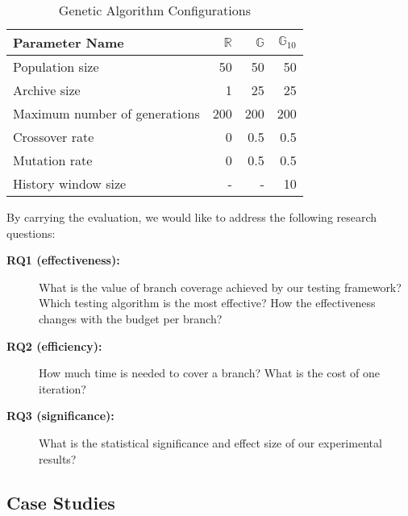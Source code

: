 \documentclass[sigconf,review,anonymous]{acmart}
\newcommand{\Random}{\mathbb{R}}
\newcommand{\Genetic}{\mathbb{G}}
\newcommand{\RGenetic}{\mathbb{G}_{10}}
\begin{document}
\begin{table}
  \caption{Genetic Algorithm Configurations}
  \label{tbl.gen.config}
    \scriptsize
  \begin{tabular}{l|r|r|r}
    \toprule
    \textbf{Parameter Name} &$\Random$&$\Genetic$ &$\RGenetic$ \\
    \hline
    Population size                   & 50  & 50  & 50  \\
    Archive size                      & 1   & 25  & 25  \\
    Maximum number of generations     & 200 & 200 & 200 \\
    Crossover rate                    & 0   & 0.5 & 0.5 \\
    Mutation rate                     & 0   & 0.5 & 0.5 \\
    History window size               & -   & -   & 10  \\
    \bottomrule
  \end{tabular}
\end{table}

By carrying the evaluation, we would like to address the following research questions:
\begin{description}
\item[\textbf{RQ1 (effectiveness):}] What is the value of branch coverage achieved by our testing framework? Which testing algorithm is the most effective? How the effectiveness changes with the budget per branch?
\item[\textbf{RQ2 (efficiency):}] How much time is needed to cover a branch? What is the cost of one iteration?
\item[\textbf{RQ3 (significance):}] What is the statistical significance and effect size of our experimental results? 
\end{description}


\subsection{Case Studies}
\label{sub.sec.case.studies}
\end{document}
